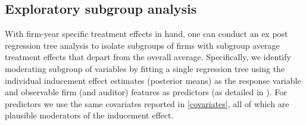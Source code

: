 \documentclass[aoas,preprint, 11pt, dvipsnames, table, x11name]{imsart}
\theoremstyle{remark}
\begin{document}
	\subsection{Exploratory subgroup analysis}\label{4.5} 
	With firm-year specific treatment effects in hand, one can conduct an ex post regression tree analysis to isolate subgroups of firms with subgroup average treatment effects that depart from the overall average.
	Specifically, we identify moderating subgroup of variables by fitting a single regression tree using the individual inducement effect estimates (posterior means) as the response variable and observable firm (and auditor) features as predictors (as detailed in \cite{bcffreak}).  For predictors we use the same covariates reported in \autoref{covariates}, all of which are plausible moderators of the inducement effect.  
	
\end{document}
